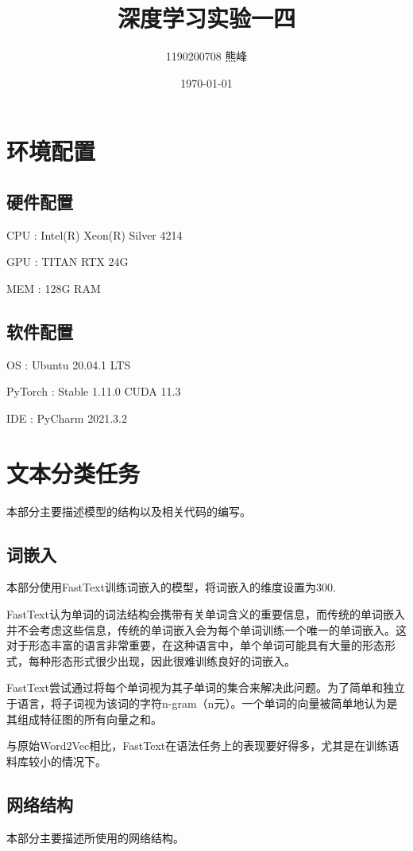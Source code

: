 \documentclass[UTF8]{ctexart}
\title{深度学习实验一四}
\author{1190200708 熊峰}
\date{\today}
\begin{document}
 
\maketitle 

\newpage
\tableofcontents
\newpage

\section{环境配置}
\subsection{硬件配置}
CPU : Intel(R) Xeon(R) Silver 4214 \par
GPU : TITAN RTX 24G \par
MEM : 128G RAM  \par
\subsection{软件配置}
OS : Ubuntu 20.04.1 LTS \par
PyTorch : Stable 1.11.0  CUDA 11.3 \par
IDE : PyCharm 2021.3.2 \par


\section{文本分类任务}
本部分主要描述模型的结构以及相关代码的编写。  
\subsection{词嵌入}
本部分使用FastText训练词嵌入的模型，将词嵌入的维度设置为300.\par
FastText认为单词的词法结构会携带有关单词含义的重要信息，而传统的单词嵌入并不会考虑这些信息，传统的单词嵌入会为每个单词训练一个唯一的单词嵌入。这对于形态丰富的语言非常重要，在这种语言中，单个单词可能具有大量的形态形式，每种形态形式很少出现，因此很难训练良好的词嵌入。\par
FastText尝试通过将每个单词视为其子单词的集合来解决此问题。为了简单和独立于语言，将子词视为该词的字符n-gram（n元）。一个单词的向量被简单地认为是其组成特征图的所有向量之和。\par
与原始Word2Vec相比，FastText在语法任务上的表现要好得多，尤其是在训练语料库较小的情况下。\par


\subsection{网络结构}
本部分主要描述所使用的网络结构。\par
\end{document}
